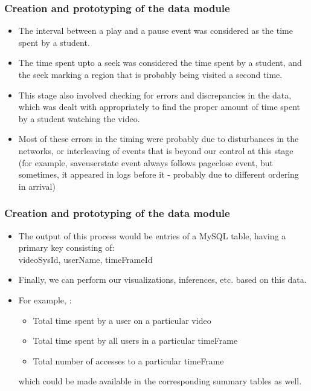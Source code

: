 \documentclass[12pt,xcolor=dvipsnames]{beamer}
\begin{document}
\begin{frame}[t]
\frametitle{Creation and prototyping of the data module}

\begin{itemize}

\item The interval between a play and a pause event was considered as the time spent by a student.

\item The time spent upto a seek was considered the time spent by a student, and the seek marking a region that is probably being visited a second time.

\item This stage also involved checking for errors and discrepancies in the data, which was dealt with appropriately to find the proper amount of time spent by a student watching the video.

\item Most of these errors in the timing were probably due to disturbances in the networks, or interleaving of events that is beyond our control at this stage (for example, saveuserstate event always follows pageclose event, but sometimes, it appeared in logs before it - probably due to different ordering in arrival)


\end{itemize}

\end{frame}

\begin{frame}[t]
\frametitle{Creation and prototyping of the data module}

\begin{itemize}
\item The output of this process would be entries of a MySQL table, having a primary key consisting of:\\videoSysId, userName, timeFrameId

\item Finally, we can perform our visualizations, inferences, etc. based on this data.

\item For example, :

\begin{itemize}
\item Total time spent by a user on a particular video
\item Total time spent by all users in a particular timeFrame
\item Total number of accesses to a particular timeFrame
\end{itemize}

which could be made available in the corresponding summary tables as well.
\end{itemize}

\end{frame}
\end{document}

